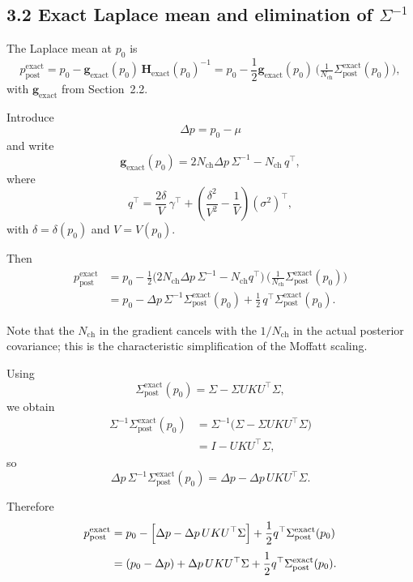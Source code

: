 \documentclass[11pt]{article}
\begin{document}
\subsection*{3.2 Exact Laplace mean and elimination of $\Sigma^{-1}$}

The Laplace mean at $p_0$ is
\[
  p_{\text{post}}^{\text{exact}}
  =
  p_0 - \mathbf{g}_{\text{exact}}(p_0)\,
         \mathbf{H}_{\text{exact}}(p_0)^{-1}
  =
  p_0 - \frac{1}{2}\mathbf{g}_{\text{exact}}(p_0)\,
         \bigl(\tfrac{1}{N_{\text{ch}}}\Sigma_{\text{post}}^{\text{exact}}(p_0)\bigr),
\]
with $\mathbf{g}_{\text{exact}}$ from Section~2.2.

Introduce
\[
  \Delta p = p_0 - \mu
\]
and write
\[
  \mathbf{g}_{\text{exact}}(p_0)
  =
  2N_{\text{ch}}\Delta p\,\Sigma^{-1}
  - N_{\text{ch}}\,q^\top,
\]
where
\[
  q^\top
  =
  \frac{2\delta}{V}\,\gamma^\top
  +
  \left(\frac{\delta^2}{V^2} - \frac{1}{V}\right)(\sigma^2)^\top,
\]
with $\delta = \delta(p_0)$ and $V = V(p_0)$.

Then
\[
  \begin{aligned}
    p_{\text{post}}^{\text{exact}}
    &=
    p_0
    - \frac{1}{2}\bigl(2N_{\text{ch}}\Delta p\,\Sigma^{-1} - N_{\text{ch}}q^\top\bigr)
      \,\bigl(\tfrac{1}{N_{\text{ch}}}\Sigma_{\text{post}}^{\text{exact}}(p_0)\bigr)\\[3pt]
    &=
    p_0
    - \Delta p\,\Sigma^{-1}\Sigma_{\text{post}}^{\text{exact}}(p_0)
    + \frac{1}{2}\,q^\top
      \Sigma_{\text{post}}^{\text{exact}}(p_0).
  \end{aligned}
\]

Note that the $N_{\text{ch}}$ in the gradient cancels with the
$1/N_{\text{ch}}$ in the actual posterior covariance; this is the
characteristic simplification of the Moffatt scaling.

Using
\[
  \Sigma_{\text{post}}^{\text{exact}}(p_0)
  =
  \Sigma - \Sigma U K U^\top\Sigma,
\]
we obtain
\[
  \begin{aligned}
    \Sigma^{-1}\Sigma_{\text{post}}^{\text{exact}}(p_0)
    &=
    \Sigma^{-1}\bigl(\Sigma - \Sigma U K U^\top\Sigma\bigr)\\[3pt]
    &=
    I - U K U^\top\Sigma,
  \end{aligned}
\]
so
\[
  \Delta p\,\Sigma^{-1}\Sigma_{\text{post}}^{\text{exact}}(p_0)
  =
  \Delta p - \Delta p\,U K U^\top\Sigma.
\]

Therefore
\[
  \begin{aligned}
    p_{\text{post}}^{\text{exact}}
    &=
    p_0
    - \Bigl[\Delta p - \Delta p\,U K U^\top\Sigma\Bigr]
    + \frac{1}{2}q^\top
      \Sigma_{\text{post}}^{\text{exact}}(p_0)\\[3pt]
    &=
    (p_0 - \Delta p)
    + \Delta p\,U K U^\top\Sigma
    + \frac{1}{2}q^\top
      \Sigma_{\text{post}}^{\text{exact}}(p_0).
  \end{aligned}
\]
\end{document}
